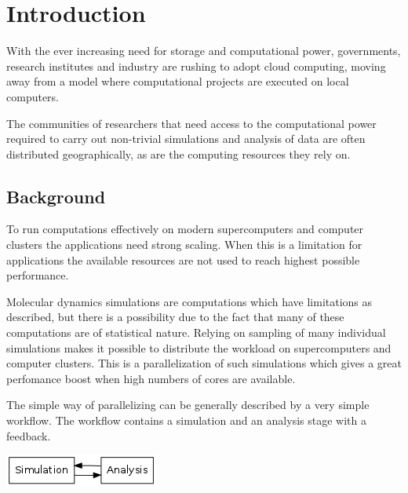 \chapter{Introduction}
With the ever increasing need for storage and computational power,
governments, research institutes and industry are rushing to adopt
cloud computing, moving away from a model where computational projects
are executed on local computers.

The communities of researchers that need access to the computational
power required to carry out non-trivial simulations and analysis of
data are often distributed geographically, as are the computing
resources they rely on.



\section{Background}
To run computations effectively on modern supercomputers and computer
clusters the applications need strong scaling. When this is a
limitation for applications the available resources are not used to
reach highest possible performance.




Molecular dynamics simulations are computations which have limitations
as described, but there is a possibility due to the fact that many of
these computations are of statistical nature. Relying on sampling of
many individual simulations makes it possible to distribute the
workload on supercomputers and computer clusters. This is a
parallelization of such simulations which gives a great perfomance
boost when high numbers of cores are available.

The simple way of parallelizing can be generally described by a very
simple workflow. The workflow contains a simulation and an analysis
stage with a feedback. 

\begin{center}
\includegraphics{Chapters/IntroductionIncludes/workflow.png}
\end{center}

